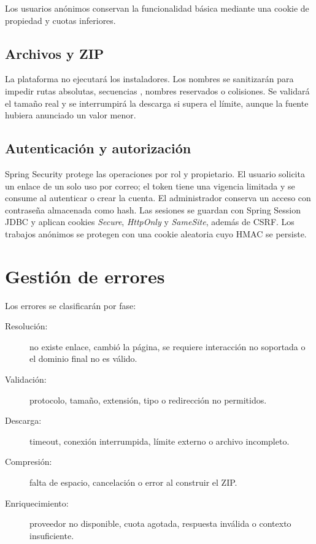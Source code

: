 Los usuarios anónimos conservan la funcionalidad básica mediante una cookie de propiedad y cuotas inferiores.

\subsection{Archivos y ZIP}

La plataforma no ejecutará los instaladores. Los nombres se sanitizarán para impedir rutas absolutas, secuencias , nombres reservados o colisiones. Se validará el tamaño real y se interrumpirá la descarga si supera el límite, aunque la fuente hubiera anunciado un valor menor.

\subsection{Autenticación y autorización}

Spring Security protege las operaciones por rol y propietario. El usuario solicita un enlace de un solo uso por correo; el token tiene una vigencia limitada y se consume al autenticar o crear la cuenta. El administrador conserva un acceso con contraseña almacenada como hash. Las sesiones se guardan con Spring Session JDBC y aplican cookies \emph{Secure}, \emph{HttpOnly} y \emph{SameSite}, además de CSRF. Los trabajos anónimos se protegen con una cookie aleatoria cuyo HMAC se persiste.

\section{Gestión de errores}

Los errores se clasificarán por fase:

\begin{description}
	\item[Resolución:] no existe enlace, cambió la página, se requiere interacción no soportada o el dominio final no es válido.
	\item[Validación:] protocolo, tamaño, extensión, tipo o redirección no permitidos.
	\item[Descarga:] timeout, conexión interrumpida, límite externo o archivo incompleto.
	\item[Compresión:] falta de espacio, cancelación o error al construir el ZIP.
	\item[Enriquecimiento:] proveedor no disponible, cuota agotada, respuesta inválida o contexto insuficiente.
\end{description}

